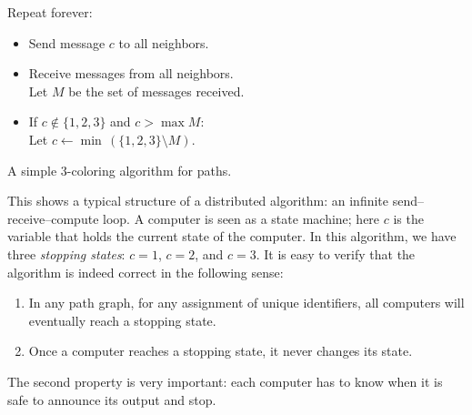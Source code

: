 \begin{table}
    \raggedright
    \algtoprule
    \begin{descriptionb}
        \item[Repeat forever:] \mbox{}
        \begin{itemize}
            \item Send message $c$ to all neighbors.
            \item Receive messages from all neighbors. \\
                  Let $M$ be the set of messages received.
            \item If $c \notin \{1,2,3\}$ and $c > \max M$: \\
                  Let $c \gets \min\,(\{1,2,3\} \setminus M)$.
        \end{itemize}
    \end{descriptionb}
    \algbottomrule
    \caption{A simple $3$-coloring algorithm for paths.}\label{tab:algo-p3c}
\end{table}

This shows a typical structure of a distributed algorithm: an infinite send--receive--compute loop. A computer is seen as a state machine; here $c$ is the variable that holds the current state of the computer. In this algorithm, we have three \emph{stopping states}: $c = 1$, $c = 2$, and $c = 3$. It is easy to verify that the algorithm is indeed correct in the following sense:
\begin{enumerate}
    \item In any path graph, for any assignment of unique identifiers, all computers will eventually reach a stopping state.
    \item Once a computer reaches a stopping state, it never changes its state.
\end{enumerate}
The second property is very important: each computer has to know when it is safe to announce its output and stop.

